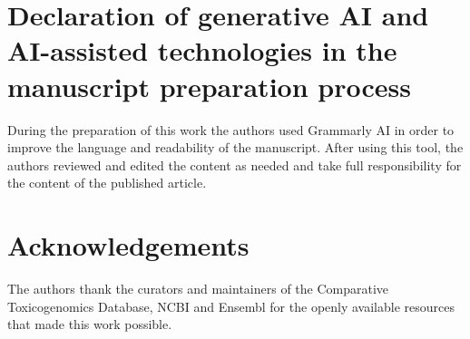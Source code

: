 \documentclass[review,12pt,authoryear]{elsarticle}
\begin{document}
\section*{Declaration of generative AI and AI-assisted technologies in the
manuscript preparation process}
During the preparation of this work the authors used Grammarly AI in order to
improve the language and readability of the manuscript. After using this tool,
the authors reviewed and edited the content as needed and take full
responsibility for the content of the published article.

\section*{Acknowledgements}
The authors thank the curators and maintainers of the Comparative Toxicogenomics
Database, NCBI and Ensembl for the openly available resources that made this
work possible.

\clearpage
\end{document}
